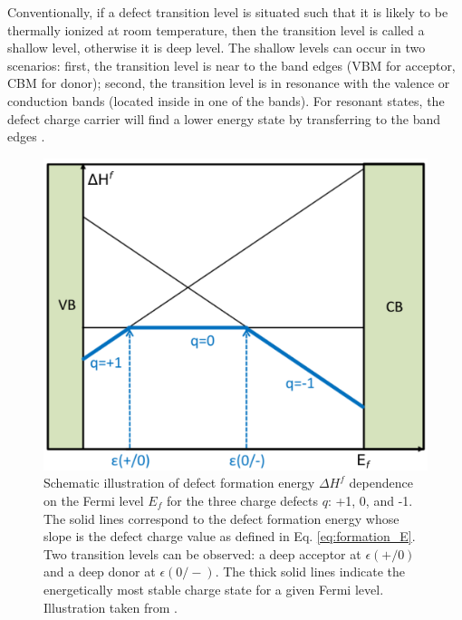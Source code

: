 Conventionally, if a defect transition level is situated such that it is likely to be thermally ionized at room temperature, then the transition level is called a shallow level, otherwise it is deep level. The shallow levels can occur in two scenarios: first, the transition level is near to the band edges (VBM for acceptor, CBM for donor); second, the transition level is in resonance with the valence or conduction bands (located inside in one of the bands).  For resonant states, the defect charge carrier will find a lower energy state by transferring to the band edges \citep{Janotti2007}.
\begin{figure}[tpbh!]
	\centering
	\includegraphics[width=0.5\linewidth]{"images/computational/trans_level"}
	\caption[ Schematic illustration of defect formation energy $\Delta H^f$ dependence on the Fermi level $E_f$ for the three charge defects $q$: +1, 0, and -1 ]{Schematic illustration of defect formation energy $\Delta H^f$ dependence on the Fermi level $E_f$ for the three charge defects $q$: +1, 0, and -1. The solid lines correspond to the defect formation energy whose slope is the defect charge value as defined in Eq. \eqref{eq:formation_E}. Two transition levels can  be observed: a deep acceptor at  $\epsilon(+/0)$ and a deep donor at $\epsilon(0/-)$. The thick solid lines indicate the energetically  most stable charge state for a given Fermi level. Illustration taken from \citep{Freysoldt2014}.}
	\label{fig:trans_level}
\end{figure}






